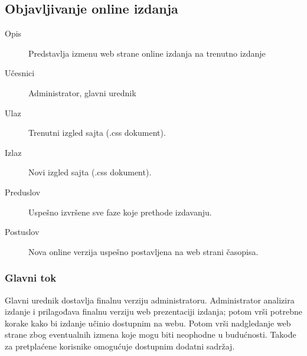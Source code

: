 \subsection{Objavljivanje online izdanja}
\begin{description}
\item [Opis] Predstavlja izmenu web strane online izdanja na trenutno izdanje
\item [Učesnici] Administrator, glavni urednik
\item [Ulaz] Trenutni izgled sajta (.css dokument).
\item [Izlaz] Novi izgled sajta (.css dokument).
\item [Preduslov] Uspešno izvršene sve faze koje prethode izdavanju.
\item [Postuslov] Nova online verzija uspešno postavljena na web strani časopisa.
\end{description}
\subsubsection{Glavni tok}
Glavni urednik dostavlja finalnu verziju administratoru. Administrator analizira izdanje i prilagođava finalnu verziju web prezentaciji izdanja; potom vrši potrebne korake kako bi izdanje učinio dostupnim na webu.
Potom vrši nadgledanje web strane zbog eventualnih izmena koje mogu biti neophodne u budućnosti. Takođe za pretplaćene korisnike omogućuje dostupnim dodatni sadržaj.
